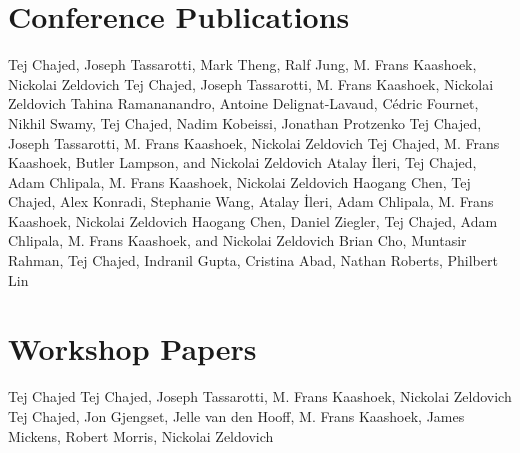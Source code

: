 \documentclass[11pt,a4paper,roman]{moderncv}   %
\begin{document}
\section{Conference Publications}
%
{Tej Chajed, Joseph Tassarotti, Mark Theng, Ralf Jung, M. Frans Kaashoek, Nickolai Zeldovich}
%
{Tej Chajed, Joseph Tassarotti, M. Frans Kaashoek, Nickolai Zeldovich}
%
{Tahina Ramananandro, Antoine Delignat-Lavaud, Cédric Fournet, Nikhil
Swamy, Tej Chajed, Nadim Kobeissi, Jonathan Protzenko}
%
{Tej Chajed, Joseph Tassarotti, M. Frans Kaashoek, Nickolai Zeldovich}
{Tej Chajed, M. Frans Kaashoek, Butler Lampson, and Nickolai Zeldovich}
%
{Atalay \.{I}leri, Tej Chajed, Adam Chlipala, M. Frans Kaashoek, Nickolai Zeldovich}
%
{Haogang Chen, Tej Chajed, Alex Konradi, Stephanie Wang, Atalay \.{I}leri, Adam Chlipala, M. Frans Kaashoek, Nickolai Zeldovich}
%
{Haogang Chen, Daniel Ziegler, Tej Chajed, Adam Chlipala, M. Frans Kaashoek, and Nickolai Zeldovich}
%
{Brian Cho, Muntasir Rahman, Tej Chajed, Indranil Gupta, Cristina Abad, Nathan Roberts, Philbert Lin}

\section{Workshop Papers}
%
{Tej Chajed}
%
{Tej Chajed, Joseph Tassarotti, M. Frans Kaashoek, Nickolai Zeldovich}
%
{Tej Chajed, Jon Gjengset, Jelle van den Hooff, M. Frans Kaashoek, James Mickens, Robert Morris, Nickolai Zeldovich}

\end{document}
